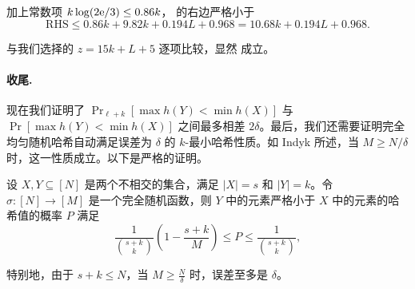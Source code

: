 加上常数项 $k \log(2 \mathrm{e}/3) \le 0.86 k$， 的右边严格小于
$$
\text{RHS} \le 0.86 k + 9.82 k + 0.194 L + 0.968 = 10.68 k + 0.194 L + 0.968.
$$

与我们选择的 $z = 15 k + L + 5$ 逐项比较，显然  成立。

\paragraph{收尾.}

现在我们证明了 $\Pr_{\ell + k}[\max h(Y) < \min h(X)]$ 与 $\Pr[\max h(Y) < \min h(X)]$ 之间最多相差 $2 \delta$。最后，我们还需要证明完全均匀随机哈希自动满足误差为 $\delta$ 的 $k$-最小哈希性质。如 Indyk \cite{minwise_Indyk} 所述，当 $M \ge N / \delta$ 时，这一性质成立。以下是严格的证明。

\begin{lemma}\label{lem:k_min_wise_full_random}
    设 $X, Y \subseteq [N]$ 是两个不相交的集合，满足 $|X| = s$ 和 $|Y| = k$。令 $\sigma: [N] \to [M]$ 是一个完全随机函数，则 $Y$ 中的元素严格小于 $X$ 中的元素的哈希值的概率 $P$ 满足
    $$
    \frac{1}{\binom{s + k}{k}} \left( 1 - \frac{s + k}{M} \right) \le P \le \frac{1}{\binom{s+k}{k}},
    $$
    
    特别地，由于 $s+k \le N$，当 $M \ge \frac{N}{\delta}$ 时，误差至多是 $\delta$。
\end{lemma}

